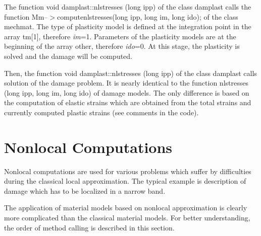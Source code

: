 The function {\sf void damplast::nlstresses (long ipp)} of the class {\sf damplast}
calls the function {\sf Mm--$>$computenlstresses(long ipp, long im, long ido);} of the class {\sf mechmat}.
The type of plasticity model is defined at the integration point in the array {\sf tm[1]}, therefore {\it im}=1.
Parameters of the plasticity models are at the beginning of the array {\sf other}, therefore {\it ido}=0.
At this stage, the plasticity is solved and the damage will be computed.

Then, the function {\sf void damplast::nlstresses (long ipp)} of the class {\sf damplast}
calls solution of the damage problem. It is nearly identical to the function
{\sf nlstresses (long ipp, long im, long ido)} of damage models. The only difference is based
on the computation of elastic strains which are obtained from the total strains and currently
computed plastic strains (see comments in the code).

\section{Nonlocal Computations}

Nonlocal computations are used for various problems which suffer by difficulties during the classical
local approximation. The typical example is description of damage which has to be localized in a narrow
band.

The application of material models based on nonlocal approximation is clearly more complicated than
the classical material models. For better understanding, the order of method calling is described in this section.

